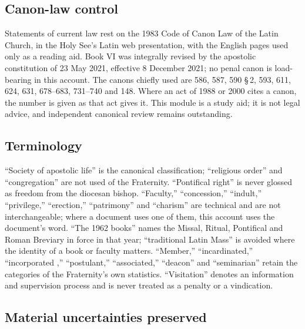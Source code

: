 \subsection{Canon-law control}

Statements of current law rest on the 1983 Code of Canon Law of the Latin
Church, in the Holy See's Latin web presentation, with the English pages
used only as a reading aid. Book VI was integrally revised by the
apostolic constitution  of 23 May 2021, effective
8 December 2021; no penal canon is load-bearing in this account. The
canons chiefly used are 586, 587, 590 §\,2, 593, 611, 624, 631, 678--683,
731--740 and 148. Where an act of 1988 or 2000 cites a canon, the number
is given as that act gives it. This module is a study aid; it is not legal
advice, and independent canonical review remains outstanding.

\subsection{Terminology}

``Society of apostolic life'' is the canonical classification; ``religious
order'' and ``congregation'' are not used of the Fraternity. ``Pontifical
right'' is never glossed as freedom from the diocesan bishop. ``Faculty,''
``concession,'' ``indult,'' ``privilege,'' ``erection,'' ``patrimony'' and
``charism'' are technical and are not interchangeable; where a document
uses one of them, this account uses the document's word. ``The 1962
books'' names the Missal, Ritual, Pontifical and Roman Breviary in force
in that year; ``traditional Latin Mass'' is avoided where the identity of
a book or faculty matters. ``Member,'' ``incardinated,'' ``incorporated
,'' ``postulant,'' ``associated,'' ``deacon'' and
``seminarian'' retain the categories of the Fraternity's own statistics.
``Visitation'' denotes an information and supervision process and is
never treated as a penalty or a vindication.

\subsection{Material uncertainties preserved}

